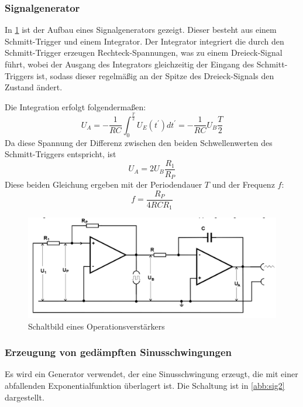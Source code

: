 \subsubsection{Signalgenerator}
In \ref{abb:sig} ist der Aufbau eines Signalgenerators gezeigt. Dieser besteht aus einem Schmitt-Trigger und einem Integrator. Der Integrator integriert die durch den Schmitt-Trigger erzeugen Rechteck-Spannungen, was zu einem Dreieck-Signal führt, wobei der Ausgang des Integrators gleichzeitig der Eingang des Schmitt-Triggers ist, sodass dieser regelmäßig an der Spitze des Dreieck-Signals den Zustand ändert.

Die Integration erfolgt folgendermaßen:
\begin{equation}
U_A = - \frac{1}{RC} \int_{0}^{\frac{T}{2}} U_E(t^\prime)dt^\prime = -\frac{1}{RC} U_B \frac{T}{2}
\end{equation}
Da diese Spannung der Differenz zwischen den beiden Schwellenwerten des Schmitt-Triggers entspricht, ist
\begin{equation}
U_A = 2U_B\frac{R_1}{R_P}
\end{equation}
Diese beiden Gleichung ergeben mit der Periodendauer $T$ und der Frequenz $f$:
\begin{equation}
f = \frac{R_P}{4RCR_1}
\end{equation}

\begin{figure}
 	\centering
 	\includegraphics[width=\textwidth]{img/gen.png}
 	\caption{Schaltbild eines Operationsverstärkers \cite{FP}}
 	\label{abb:sig}
\end{figure}

\subsubsection{Erzeugung von ged{\"a}mpften Sinusschwingungen}
Es wird ein Generator verwendet, der eine Sinusschwingung erzeugt, die mit einer abfallenden Exponentialfunktion überlagert ist. Die Schaltung ist in \ref{abb:sig2} dargestellt.

